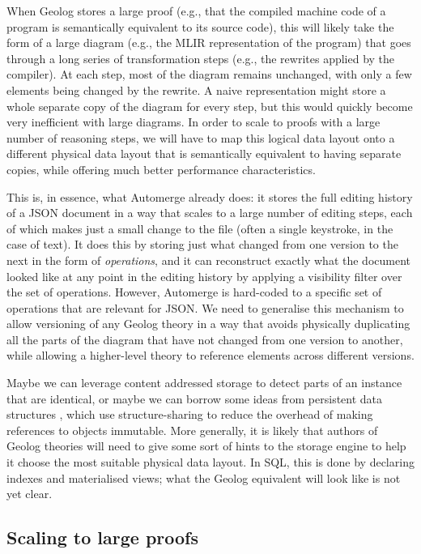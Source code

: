 \documentclass{article}
\begin{document}
When Geolog stores a large proof (e.g., that the compiled machine code of a program is semantically equivalent to its source code), this will likely take the form of a large diagram (e.g., the MLIR representation of the program) that goes through a long series of transformation steps (e.g., the rewrites applied by the compiler).
At each step, most of the diagram remains unchanged, with only a few elements being changed by the rewrite.
A naive representation might store a whole separate copy of the diagram for every step, but this would quickly become very inefficient with large diagrams.
In order to scale to proofs with a large number of reasoning steps, we will have to map this logical data layout onto a different physical data layout that is semantically equivalent to having separate copies, while offering much better performance characteristics.

This is, in essence, what Automerge already does: it stores the full editing history of a JSON document in a way that scales to a large number of editing steps, each of which makes just a small change to the file (often a single keystroke, in the case of text).
It does this by storing just what changed from one version to the next in the form of \emph{operations}, and it can reconstruct exactly what the document looked like at any point in the editing history by applying a visibility filter over the set of operations.
However, Automerge is hard-coded to a specific set of operations that are relevant for JSON.
We need to generalise this mechanism to allow versioning of any Geolog theory in a way that avoids physically duplicating all the parts of the diagram that have not changed from one version to another, while allowing a higher-level theory to reference elements across different versions.

Maybe we can leverage content addressed storage to detect parts of an instance that are identical, or maybe we can borrow some ideas from persistent data structures \citep{okasaki-1999-functional}, which use structure-sharing to reduce the overhead of making references to objects immutable.
More generally, it is likely that authors of Geolog theories will need to give some sort of hints to the storage engine to help it choose the most suitable physical data layout.
In SQL, this is done by declaring indexes and materialised views; what the Geolog equivalent will look like is not yet clear.

\subsection{Scaling to large proofs}
\end{document}

